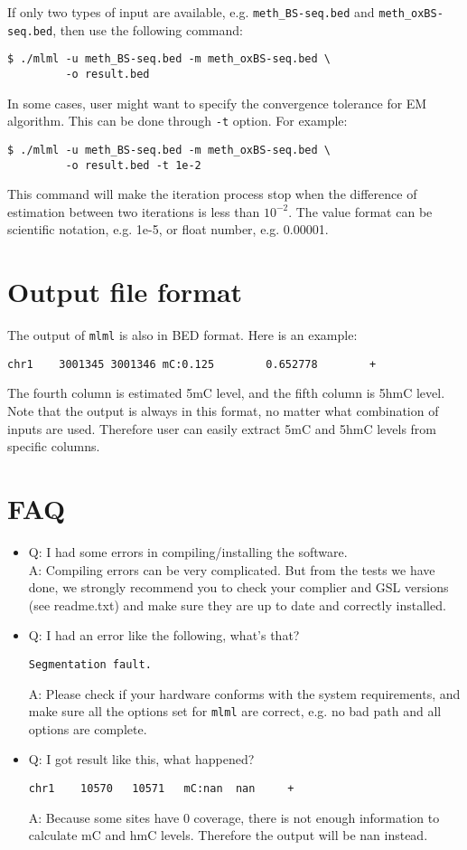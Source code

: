 \documentclass[11pt]{article}
\newcommand{\prog}[1]{\texttt{#1}}
\newcommand{\fn}[1]{\texttt{#1}}
\newcommand{\op}[1]{\texttt{#1}}
\begin{document}
If only two types of input are available, e.g. \fn{meth\_BS-seq.bed} and \fn{meth\_oxBS-seq.bed}, then use the following command:
\begin{verbatim}
$ ./mlml -u meth_BS-seq.bed -m meth_oxBS-seq.bed \
         -o result.bed
\end{verbatim}

In some cases, user might want to specify the convergence tolerance for EM algorithm. This can be done through \op{-t} option. For example:
\begin{verbatim}
$ ./mlml -u meth_BS-seq.bed -m meth_oxBS-seq.bed \
         -o result.bed -t 1e-2
\end{verbatim}
This command will make the iteration process stop when the difference of estimation between two iterations is less than $10^{-2}$. The value format can be scientific notation, e.g. 1e-5, or float number, e.g. 0.00001.

\section{Output file format}	
The output of \prog{mlml} is also in BED format. Here is an example:
\begin{verbatim}
chr1    3001345 3001346 mC:0.125        0.652778        +
\end{verbatim}
The fourth column is estimated 5mC level, and the fifth column is 5hmC level. Note that the output is always in this format, no matter what combination of inputs are used. Therefore user can easily extract 5mC and 5hmC levels from specific columns.

\section{FAQ}
\begin{itemize}
\item Q: I had some errors in compiling/installing the software.\\
A: Compiling errors can be very complicated. But from the tests we have done, we strongly recommend you to check your complier and GSL versions (see readme.txt) and make sure they are up to date and correctly installed.

\item Q: I had an error like the following, what's that?
\begin{verbatim}
Segmentation fault.
\end{verbatim}
A: Please check if your hardware conforms with the system requirements, and make sure all the options set for \prog{mlml} are correct, e.g. no bad path and all options are complete.

\item Q: I got result like this, what happened?
\begin{verbatim}
chr1    10570   10571   mC:nan  nan     +
\end{verbatim}
A: Because some sites have 0 coverage, there is not enough information to calculate mC and hmC levels. Therefore the output will be nan instead.
\end{itemize}
\end{document}
